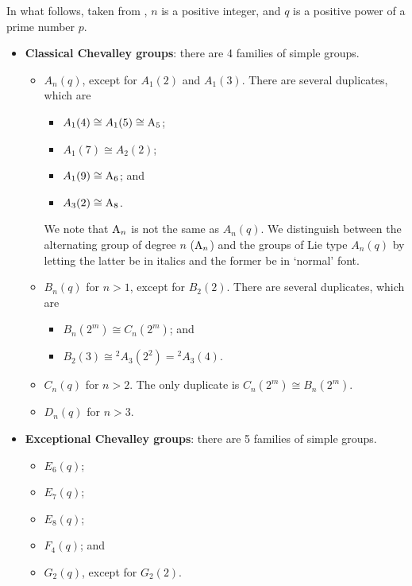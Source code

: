In what follows, taken from \cite{wikipedia_list-of-simple-groups}, $n$ is a positive integer, and $q$ is a positive power of a prime number $p$.
\begin{itemize}
    \item \textbf{Classical Chevalley groups}: there are 4 families of simple groups.
    \begin{itemize}
        \item $A_n(q)$, except for $A_1(2)$ and $A_1(3)$. There are several duplicates, which are
        \begin{itemize}
            \item $A_1(4) \cong A_1(5) \cong \mathrm{A}_{5}$;
            \item $A_1(7) \cong A_2(2)$;
            \item $A_1(9) \cong \mathrm{A}_{6}$; and
            \item $A_3(2) \cong \mathrm{A}_{8}$.
        \end{itemize}
        We note that $\mathrm{A}_{n}$ is not the same as $A_n(q)$. We distinguish between the alternating group of degree $n$ ($\mathrm{A}_{n}$) and the groups of Lie type $A_n(q)$ by letting the latter be in italics and the former be in `normal' font.

        \item $B_n(q)$ for $n > 1$, except for $B_2(2)$. There are several duplicates, which are
        \begin{itemize}
            \item $B_n(2^m) \cong C_n(2^m)$; and
            \item $B_2(3) \cong {^2A_3(2^2)} = {^2A_3(4)}$.
        \end{itemize}
        \item $C_n(q)$ for $n > 2$. The only duplicate is $C_n(2^m) \cong B_n(2^m)$.
        \item $D_n(q)$ for $n > 3$.
    \end{itemize}
    
    \item \textbf{Exceptional Chevalley groups}: there are 5 families of simple groups.
    \begin{itemize}
        \item $E_6(q)$;
        \item $E_7(q)$;
        \item $E_8(q)$;
        \item $F_4(q)$; and
        \item $G_2(q)$, except for $G_2(2)$.
    \end{itemize}
    

\end{itemize}
